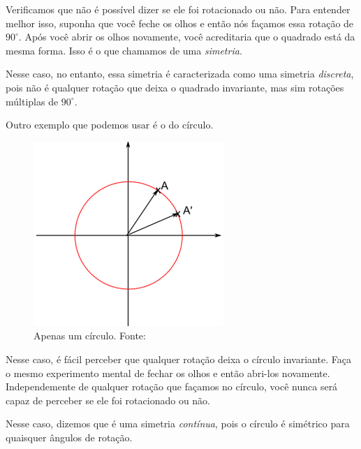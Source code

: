 \documentclass{article}
\numberwithin{equation}{section}
\numberwithin{figure}{section}
\begin{document}
Verificamos que não é possível dizer se ele foi rotacionado ou não. Para entender melhor isso, suponha que você feche os olhos e então nós façamos essa rotação de $90^{\circ}$. Após você abrir os olhos novamente, você acreditaria que o quadrado está da mesma forma. Isso é o que chamamos de uma \textit{simetria}. 

Nesse caso, no entanto, essa simetria é caracterizada como uma simetria \textit{discreta}, pois não é qualquer rotação que deixa o quadrado invariante, mas sim rotações múltiplas de $90^{\circ}$. 

Outro exemplo que podemos usar é o do círculo. 
\begin{figure}[H]
	\centering
	\includegraphics[scale=0.5]{figures/circ.png}
	\caption{Apenas um círculo. Fonte: \cite{jakob}}
\end{figure}
Nesse caso, é fácil perceber que qualquer rotação deixa o círculo invariante. Faça o mesmo experimento mental de fechar os olhos e então abri-los novamente. Independemente de qualquer rotação que façamos no círculo, você nunca será capaz de perceber se ele foi rotacionado ou não. 

Nesse caso, dizemos que é uma simetria \textit{contínua}, pois o círculo é simétrico para quaisquer ângulos de rotação. 
\end{document}
